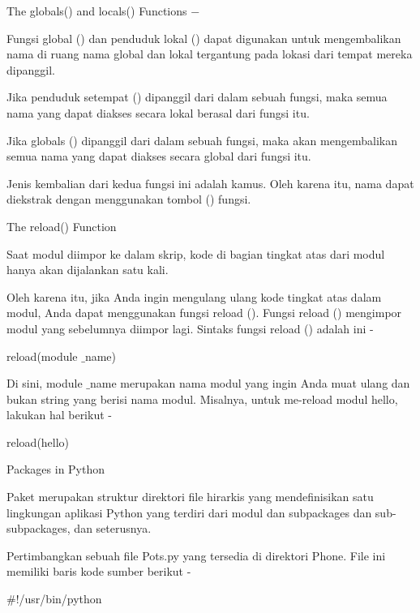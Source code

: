 \vspace{12pt}
\noindent 
The $  $globals() $  $and $  $locals() $  $Functions  $ - $ \par
\noindent 
Fungsi global () dan penduduk lokal () dapat digunakan untuk mengembalikan nama di ruang nama global dan lokal tergantung pada lokasi dari tempat mereka dipanggil. \par
\noindent 
Jika penduduk setempat () dipanggil dari dalam sebuah fungsi, maka semua nama yang dapat diakses secara lokal berasal dari fungsi itu. \par
\noindent 
Jika globals () dipanggil dari dalam sebuah fungsi, maka akan mengembalikan semua nama yang dapat diakses secara global dari fungsi itu. \par
\noindent 
Jenis kembalian dari kedua fungsi ini adalah kamus. Oleh karena itu, nama dapat diekstrak dengan menggunakan tombol () fungsi. \par
\vspace{12pt}
\noindent 
The $  $reload() $  $Function \par
\noindent 
Saat modul diimpor ke dalam skrip, kode di bagian tingkat atas dari modul hanya akan dijalankan satu kali. \par
\noindent 
Oleh karena itu, jika Anda ingin mengulang ulang kode tingkat atas dalam modul, Anda dapat menggunakan fungsi reload (). Fungsi reload () mengimpor modul yang sebelumnya diimpor lagi. Sintaks fungsi reload () adalah ini - \par
\noindent 
 \hspace*{0.5in} reload(module $  \_  $name) \par
\noindent 
Di sini, module $  \_  $name merupakan nama modul yang ingin Anda muat ulang dan bukan string yang berisi nama modul. Misalnya, untuk me-reload modul hello, lakukan hal berikut - \par
\noindent 
 \hspace*{0.5in} reload(hello) \par
\vspace{12pt}
\noindent 
Packages in Python \par
\noindent 
Paket merupakan struktur direktori file hirarkis yang mendefinisikan satu lingkungan aplikasi Python yang terdiri dari modul dan subpackages dan sub-subpackages, dan seterusnya. \par
\noindent 
Pertimbangkan sebuah file Pots.py yang tersedia di direktori Phone. File ini memiliki baris kode sumber berikut - \par
\noindent 
 \hspace*{0.5in}  $  \#  $!/usr/bin/python \par
